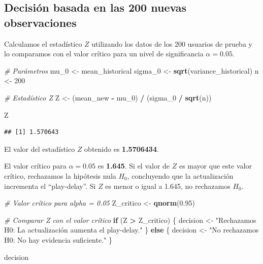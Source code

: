 \documentclass[
]{article}
\newenvironment{Shaded}{\begin{snugshade}}{\end{snugshade}}
\newcommand{\CommentTok}[1]{\textcolor[rgb]{0.56,0.35,0.01}{\textit{#1}}}
\newcommand{\ControlFlowTok}[1]{\textcolor[rgb]{0.13,0.29,0.53}{\textbf{#1}}}
\newcommand{\DecValTok}[1]{\textcolor[rgb]{0.00,0.00,0.81}{#1}}
\newcommand{\FloatTok}[1]{\textcolor[rgb]{0.00,0.00,0.81}{#1}}
\newcommand{\FunctionTok}[1]{\textcolor[rgb]{0.13,0.29,0.53}{\textbf{#1}}}
\newcommand{\NormalTok}[1]{#1}
\newcommand{\OtherTok}[1]{\textcolor[rgb]{0.56,0.35,0.01}{#1}}
\newcommand{\SpecialCharTok}[1]{\textcolor[rgb]{0.81,0.36,0.00}{\textbf{#1}}}
\newcommand{\StringTok}[1]{\textcolor[rgb]{0.31,0.60,0.02}{#1}}
\begin{document}
\subsection{Decisión basada en las 200 nuevas
observaciones}\label{decisiuxf3n-basada-en-las-200-nuevas-observaciones}

Calculamos el estadístico \(Z\) utilizando los datos de los 200 usuarios
de prueba y lo comparamos con el valor crítico para un nivel de
significancia \(\alpha = 0.05\).

\begin{Shaded}
\begin{Highlighting}[]
\CommentTok{\# Parámetros}
\NormalTok{mu\_0 }\OtherTok{\textless{}{-}}\NormalTok{ mean\_historical }
\NormalTok{sigma\_0 }\OtherTok{\textless{}{-}} \FunctionTok{sqrt}\NormalTok{(variance\_historical) }
\NormalTok{n }\OtherTok{\textless{}{-}} \DecValTok{200} 

\CommentTok{\# Estadístico Z}
\NormalTok{Z }\OtherTok{\textless{}{-}}\NormalTok{ (mean\_new }\SpecialCharTok{{-}}\NormalTok{ mu\_0) }\SpecialCharTok{/}\NormalTok{ (sigma\_0 }\SpecialCharTok{/} \FunctionTok{sqrt}\NormalTok{(n))}

\NormalTok{Z}
\end{Highlighting}
\end{Shaded}

\begin{verbatim}
## [1] 1.570643
\end{verbatim}

El valor del estadístico \(Z\) obtenido es \textbf{1.5706434}.

El valor crítico para \(\alpha = 0.05\) es \textbf{1.645}. Si el valor
de \(Z\) es mayor que este valor crítico, rechazamos la hipótesis nula
\(H_0\), concluyendo que la actualización incrementa el ``play-delay''.
Si \(Z\) es menor o igual a 1.645, no rechazamos \(H_0\).

\begin{Shaded}
\begin{Highlighting}[]
\CommentTok{\# Valor crítico para alpha = 0.05}
\NormalTok{Z\_critico }\OtherTok{\textless{}{-}} \FunctionTok{qnorm}\NormalTok{(}\FloatTok{0.95}\NormalTok{)}

\CommentTok{\# Comparar Z con el valor crítico}
\ControlFlowTok{if}\NormalTok{ (Z }\SpecialCharTok{\textgreater{}}\NormalTok{ Z\_critico) \{}
\NormalTok{  decision }\OtherTok{\textless{}{-}} \StringTok{"Rechazamos H0: La actualización aumenta el play{-}delay."}
\NormalTok{\} }\ControlFlowTok{else}\NormalTok{ \{}
\NormalTok{  decision }\OtherTok{\textless{}{-}} \StringTok{"No rechazamos H0: No hay evidencia suficiente."}
\NormalTok{\}}

\NormalTok{decision}
\end{Highlighting}
\end{Shaded}
\end{document}
